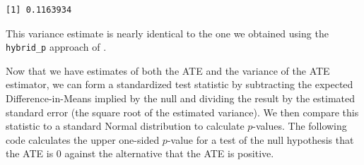 \documentclass[
  12pt,
  leqno]{article}
\newenvironment{Shaded}{\begin{snugshade}}{\end{snugshade}}
\newcommand{\AttributeTok}[1]{\textcolor[rgb]{0.13,0.29,0.53}{#1}}
\newcommand{\CommentTok}[1]{\textcolor[rgb]{0.56,0.35,0.01}{\textit{#1}}}
\newcommand{\DataTypeTok}[1]{\textcolor[rgb]{0.13,0.29,0.53}{#1}}
\newcommand{\DecValTok}[1]{\textcolor[rgb]{0.00,0.00,0.81}{#1}}
\newcommand{\FunctionTok}[1]{\textcolor[rgb]{0.13,0.29,0.53}{\textbf{#1}}}
\newcommand{\NormalTok}[1]{#1}
\newcommand{\OtherTok}[1]{\textcolor[rgb]{0.56,0.35,0.01}{#1}}
\newcommand{\SpecialCharTok}[1]{\textcolor[rgb]{0.81,0.36,0.00}{\textbf{#1}}}
\newcommand{\StringTok}[1]{\textcolor[rgb]{0.31,0.60,0.02}{#1}}
\begin{document}
\begin{Shaded}
\end{Shaded}

\begin{verbatim}
[1] 0.1163934
\end{verbatim}

\doublespacing

This variance estimate is nearly identical to the one we obtained using
the \texttt{hybrid\_p} approach of \citet{pashleymiratrix2021}.

Now that we have estimates of both the ATE and the variance of the ATE
estimator, we can form a standardized test statistic by subtracting the
expected Difference-in-Means implied by the null and dividing the result
by the estimated standard error (the square root of the estimated
variance). We then compare this statistic to a standard Normal
distribution to calculate \(p\)-values. The following code calculates
the upper one-sided \(p\)-value for a test of the null hypothesis that
the ATE is \(0\) against the alternative that the ATE is positive.
\end{document}
